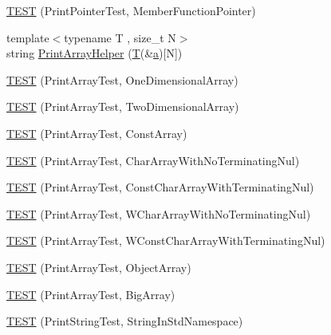 \begin{DoxyCompactItemize}
\item 
\hyperlink{namespacetesting_1_1gtest__printers__test_a9d998b210890d3d7e085d01c457f650f}{T\+E\+ST} (Print\+Pointer\+Test, Member\+Function\+Pointer)
\item 
{\footnotesize template$<$typename T , size\+\_\+t N$>$ }\\string \hyperlink{namespacetesting_1_1gtest__printers__test_a10300ded1e327c98c6a36beb7ad49e58}{Print\+Array\+Helper} (\hyperlink{functions__7_8js_adf1f3edb9115acb0a1e04209b7a9937b}{T}(\&\hyperlink{_07copy_08_2_read_camera_model_8m_a551a3d351eadcc0b9b1a2f24f0fb5ea0}{a})\mbox{[}N\mbox{]})
\item 
\hyperlink{namespacetesting_1_1gtest__printers__test_a3845c4717b03cb5ad309c7d9a37acb0a}{T\+E\+ST} (Print\+Array\+Test, One\+Dimensional\+Array)
\item 
\hyperlink{namespacetesting_1_1gtest__printers__test_ac366b9ec749b2499d21583d3b8f86273}{T\+E\+ST} (Print\+Array\+Test, Two\+Dimensional\+Array)
\item 
\hyperlink{namespacetesting_1_1gtest__printers__test_a8b5638f178c12f58707ca0f02a3b4d41}{T\+E\+ST} (Print\+Array\+Test, Const\+Array)
\item 
\hyperlink{namespacetesting_1_1gtest__printers__test_a3bae023a42049745b49fa1f2db9a0cb2}{T\+E\+ST} (Print\+Array\+Test, Char\+Array\+With\+No\+Terminating\+Nul)
\item 
\hyperlink{namespacetesting_1_1gtest__printers__test_ab51b9ecaca7d635326101b23d5e8afd2}{T\+E\+ST} (Print\+Array\+Test, Const\+Char\+Array\+With\+Terminating\+Nul)
\item 
\hyperlink{namespacetesting_1_1gtest__printers__test_ac19ec2732031bfe83b30ea9f00259ef3}{T\+E\+ST} (Print\+Array\+Test, W\+Char\+Array\+With\+No\+Terminating\+Nul)
\item 
\hyperlink{namespacetesting_1_1gtest__printers__test_a6a7cbcdbe748a1d4e90658f48f36c9da}{T\+E\+ST} (Print\+Array\+Test, W\+Const\+Char\+Array\+With\+Terminating\+Nul)
\item 
\hyperlink{namespacetesting_1_1gtest__printers__test_af91d8ad9d6c7547913fe05c7acc44114}{T\+E\+ST} (Print\+Array\+Test, Object\+Array)
\item 
\hyperlink{namespacetesting_1_1gtest__printers__test_a596493b56489aa1571fa26d1402e7116}{T\+E\+ST} (Print\+Array\+Test, Big\+Array)
\item 
\hyperlink{namespacetesting_1_1gtest__printers__test_abbd355e76033f0defd76c37523ad0f60}{T\+E\+ST} (Print\+String\+Test, String\+In\+Std\+Namespace)
\item 

\end{DoxyCompactItemize}
